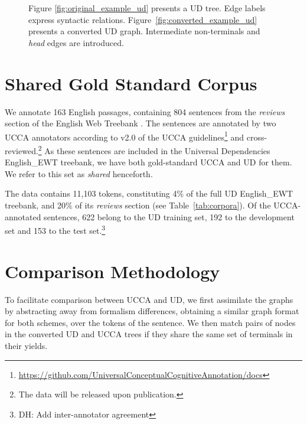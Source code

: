 \documentclass[11pt,a4paper]{article}
\newcommand{\daniel}[1]{\footnote{\color{blue}DH: #1}}
\begin{document}
\begin{figure}[!ht]
\caption{Figure \ref{fig:original_example_ud} presents a UD tree.
  Edge labels express syntactic relations.
Figure~\ref{fig:converted_example_ud} presents a converted UD graph.
Intermediate non-terminals and \textit{head} edges are introduced.
}\label{fig:ud_examples}
\end{figure}


\section{Shared Gold Standard Corpus}\label{sec:shared}

We annotate 163 English passages, containing 804 sentences
from the \textit{reviews} section of the 
English Web Treebank \cite[EWT; ][]{bies2012english}.
The sentences are annotated by two UCCA annotators
according to v2.0 of the UCCA
guidelines\footnote{\url{https://github.com/UniversalConceptualCognitiveAnnotation/docs}}
and cross-reviewed.\footnote{The data will be released upon publication.}
As these sentences are included in the Universal Dependencies 
English\_EWT treebank, we have both gold-standard UCCA and UD for them. 
We refer to this set as \textit{shared} henceforth.

The data contains 11,103 tokens, constituting 4\% of the full UD English\_EWT treebank,
and 20\% of its \textit{reviews} section
(see Table~\ref{tab:corpora}).
Of the UCCA-annotated sentences, 622 belong to the UD training set,
192 to the development set and 153 to the test set.\daniel{Add inter-annotator agreement}


\section{Comparison Methodology}\label{sec:methodology}

To facilitate comparison between UCCA and UD,
we first assimilate the graphs by abstracting away from formalism differences,
obtaining a similar graph format for both schemes,
over the tokens of the sentence.
We then match pairs of nodes in the converted UD and UCCA trees
if they share the same set of terminals in their yields. %
\end{document}

